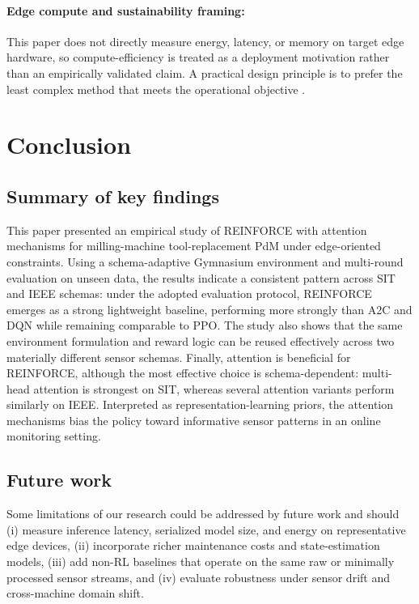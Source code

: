 \documentclass[sn-basic]{sn-jnl} %
\begin{document}
\paragraph{Edge compute and sustainability framing:}
This paper does not directly measure energy, latency, or memory on target edge hardware, so compute-efficiency is treated as a deployment motivation rather than an empirically validated claim. A practical design principle is to prefer the least complex method that meets the operational objective \cite{Schwartz2020, Strubell2019}.

\section{Conclusion}
\label{sec:conclusion}
\subsection{Summary of key findings}
This paper presented an empirical study of \textsc{REINFORCE} with attention mechanisms for milling-machine tool-replacement PdM under edge-oriented constraints. Using a schema-adaptive Gymnasium environment and multi-round evaluation on unseen data, the results indicate a consistent pattern across SIT and IEEE schemas: under the adopted evaluation protocol, \textsc{REINFORCE} emerges as a strong lightweight baseline, performing more strongly than \textsc{A2C} and \textsc{DQN} while remaining comparable to \textsc{PPO}. The study also shows that the same environment formulation and reward logic can be reused effectively across two materially different sensor schemas. Finally, attention is beneficial for \textsc{REINFORCE}, although the most effective choice is schema-dependent: multi-head attention is strongest on SIT, whereas several attention variants perform similarly on IEEE. Interpreted as representation-learning priors, the attention mechanisms bias the policy toward informative sensor patterns in an online monitoring setting.

\subsection{Future work}
Some limitations of our research could be addressed by future work and should (i) measure inference latency, serialized model size, and energy on representative edge devices, (ii) incorporate richer maintenance costs and state-estimation models, (iii) add non-RL baselines that operate on the same raw or minimally processed sensor streams, and (iv) evaluate robustness under sensor drift and cross-machine domain shift.
\end{document}
